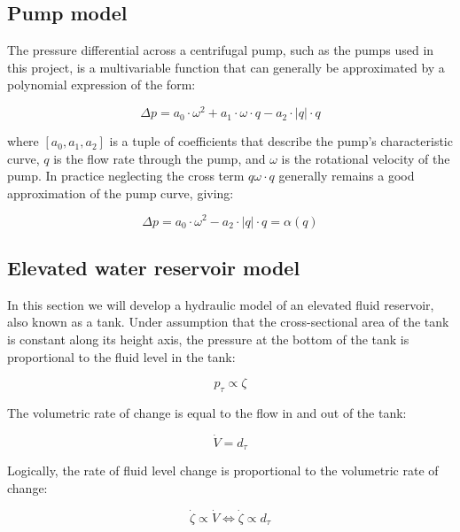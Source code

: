 \subsection{Pump model}\label{subsec:PumpModel}

The pressure differential across a centrifugal pump, such as the pumps used in this project, is a multivariable function that can generally be approximated by a polynomial expression of the form:

\begin{equation}\label{eq:PumpPressure}
	\Delta p =   a_0\cdot \omega^2 +  a_1\cdot \omega \cdot q -a_2\cdot |q|\cdot q
\end{equation}

where $[a_0,a_1,a_2]$ is a tuple of coefficients that describe the pump's characteristic curve, $q$ is the flow rate through the pump, and $\omega$ is the rotational velocity of the pump. In practice neglecting the cross term $q\omega \cdot q$ generally remains a good approximation of the pump curve, giving:

\begin{equation}\label{eq:PumpPressureSimple}
	\Delta p =   a_0\cdot \omega^2  -a_2\cdot |q|\cdot q = \alpha(q)
\end{equation}

\subsection{Elevated water reservoir model}

In this section we will develop a hydraulic model of an elevated fluid reservoir, also known as a tank.
Under assumption that the cross-sectional area of the tank is constant along its height axis, the pressure at the bottom of the tank is proportional to the fluid level in the tank:

\begin{equation} \label{eq:p prop zeta}
	p_\tau \propto \zeta
\end{equation}

The volumetric rate of change is equal to the flow in and out of the tank:

\begin{equation} \label{eq:vdot = dt}
	\dot{V} = d_\tau
\end{equation}

Logically, the rate of fluid level change is proportional to the volumetric rate of change:  
 
 \begin{equation} \label{eq:zeta prop dt}
	\dot{\zeta} \propto \dot{V} \Leftrightarrow \dot{\zeta} \propto d_\tau
\end{equation} 

